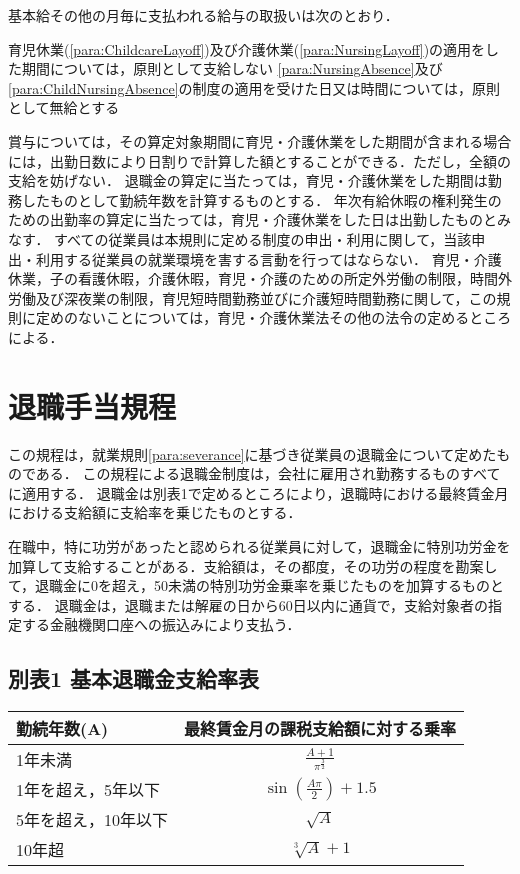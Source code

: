 \documentclass[11pt,a4paper]{jsarticle}
\begin{document}
基本給その他の月毎に支払われる給与の取扱いは次のとおり．
\begin{enumerate}
	\itm 育児休業(\ref{para:ChildcareLayoff})及び介護休業(\ref{para:NursingLayoff})の適用をした期間については，原則として支給しない
	\itm \ref{para:NursingAbsence}及び\ref{para:ChildNursingAbsence}の制度の適用を受けた日又は時間については，原則として無給とする
\end{enumerate}

\term 賞与については，その算定対象期間に育児・介護休業をした期間が含まれる場合には，出勤日数により日割りで計算した額とすることができる．ただし，全額の支給を妨げない．
\term 退職金の算定に当たっては，育児・介護休業をした期間は勤務したものとして勤続年数を計算するものとする．
\term 年次有給休暇の権利発生のための出勤率の算定に当たっては，育児・介護休業をした日は出勤したものとみなす．
すべての従業員は本規則に定める制度の申出・利用に関して，当該申出・利用する従業員の就業環境を害する言動を行ってはならない．
育児・介護休業，子の看護休暇，介護休暇，育児・介護のための所定外労働の制限，時間外労働及び深夜業の制限，育児短時間勤務並びに介護短時間勤務に関して，この規則に定めのないことについては，育児・介護休業法その他の法令の定めるところによる．


\clearpage
\section{退職手当規程}
この規程は，就業規則\ref{para:severance}に基づき従業員の退職金について定めたものである．
この規程による退職金制度は，会社に雇用され勤務するものすべてに適用する．
退職金は別表1で定めるところにより，退職時における最終賃金月における支給額に支給率を乗じたものとする．

在職中，特に功労があったと認められる従業員に対して，退職金に特別功労金を加算して支給することがある．支給額は，その都度，その功労の程度を勘案して，退職金に0を超え，50未満の特別功労金乗率を乗じたものを加算するものとする．
退職金は，退職または解雇の日から60日以内に通貨で，支給対象者の指定する金融機関口座への振込みにより支払う．
\clearpage
\subsection*{別表1 基本退職金支給率表}

\begin{table}[!!htb]
	\begin{tabular}{|l|c|} \hline
		勤続年数(A) & 最終賃金月の課税支給額に対する乗率 \\ \hline \hline
		1年未満          &  $\frac{A+1}{π^{\frac{3}{2}}}$  \\
		1年を超え，5年以下 & $\sin(\frac{A\pi}{2})+1.5$ \\
		5年を超え，10年以下 & $\sqrt{A}$ \\ 
		10年超           & $\sqrt[3]{A}+1$ \\ \hline
	\end{tabular}
\end{table}
\end{document}
